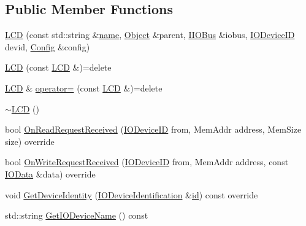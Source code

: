 \subsection*{Public Member Functions}
\begin{DoxyCompactItemize}
\item 
\hyperlink{class_simulator_1_1_l_c_d_a09a006a9a3aef907ef3126eb70989592}{L\+C\+D} (const std\+::string \&\hyperlink{mtconf_8c_a8f8f80d37794cde9472343e4487ba3eb}{name}, \hyperlink{class_simulator_1_1_object}{Object} \&parent, \hyperlink{class_simulator_1_1_i_i_o_bus}{I\+I\+O\+Bus} \&iobus, \hyperlink{namespace_simulator_a3493d987c866ad6b8aaa704c42502db0}{I\+O\+Device\+I\+D} devid, \hyperlink{class_config}{Config} \&config)
\item 
\hyperlink{class_simulator_1_1_l_c_d_a93b1e18f8b6addc06234d07d08b42be2}{L\+C\+D} (const \hyperlink{class_simulator_1_1_l_c_d}{L\+C\+D} \&)=delete
\item 
\hyperlink{class_simulator_1_1_l_c_d}{L\+C\+D} \& \hyperlink{class_simulator_1_1_l_c_d_a3c4785ccc9c3a7774a64f11f61572ea3}{operator=} (const \hyperlink{class_simulator_1_1_l_c_d}{L\+C\+D} \&)=delete
\item 
\hyperlink{class_simulator_1_1_l_c_d_afe60ed9c66882ca71f377a2ae3eedbad}{$\sim$\+L\+C\+D} ()
\item 
bool \hyperlink{class_simulator_1_1_l_c_d_ad9b0d6c641f7588f54c42b90d849b896}{On\+Read\+Request\+Received} (\hyperlink{namespace_simulator_a3493d987c866ad6b8aaa704c42502db0}{I\+O\+Device\+I\+D} from, Mem\+Addr address, Mem\+Size size) override
\item 
bool \hyperlink{class_simulator_1_1_l_c_d_af0e23f7f6d7c99cd011ff2260e5f5198}{On\+Write\+Request\+Received} (\hyperlink{namespace_simulator_a3493d987c866ad6b8aaa704c42502db0}{I\+O\+Device\+I\+D} from, Mem\+Addr address, const \hyperlink{struct_simulator_1_1_i_o_data}{I\+O\+Data} \&data) override
\item 
void \hyperlink{class_simulator_1_1_l_c_d_a86e52e99e37c6d38847a24e4a9640871}{Get\+Device\+Identity} (\hyperlink{struct_simulator_1_1_i_o_device_identification}{I\+O\+Device\+Identification} \&\hyperlink{mtconf_8c_aa3185401f04d30bd505daebf48c39cc5}{id}) const override
\item 
std\+::string \hyperlink{class_simulator_1_1_l_c_d_a9dc6ccad26cf7867f52b881ada033012}{Get\+I\+O\+Device\+Name} () const 
\end{DoxyCompactItemize}


